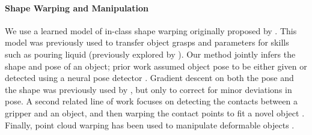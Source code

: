 \documentclass{article}
\begin{document}
\paragraph{Shape Warping and Manipulation} We use a learned model of in-class shape warping originally proposed by \citet{rodriguez18learning}. This model was previously used to transfer object grasps \cite{rodriguez18transferring,rodriguez18transferringa,klamt18supervised} and parameters for skills such as pouring liquid \cite{thompson21shapebased} (previously explored by \cite{brandi14generalizing}). Our method jointly infers the shape and pose of an object; prior work assumed object pose to be either given \cite{thompson21shapebased} or detected using a neural pose detector \cite{klamt18supervised}. Gradient descent on both the pose and the shape was previously used by \citet{rodriguez18transferring,rodriguez18transferringa}, but only to correct for minor deviations in pose. A second related line of work focuses on detecting the contacts between a gripper and an object, and then warping the contact points to fit a novel object \cite{li07datadriven,benamor12generalization,hillenbrand12transferring,jakel12learning,stouraitis15functional,rodriguez18learning,pavlichenko19autonomous,tian19transferring}. Finally, point cloud warping has been used to manipulate deformable objects \cite{lee15learning,schulman16learning}.

\end{document}
